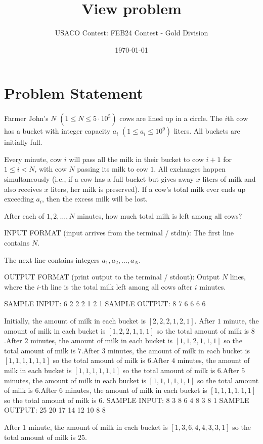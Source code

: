 \documentclass[12pt]{article}
\title{View problem}
\author{USACO Contest: FEB24 Contest - Gold Division}
\date{\today}
\begin{document}
\maketitle

\section*{Problem Statement}


Farmer John's $N$ $(1 \leq N \leq 5 \cdot 10^5)$ cows are lined up in a circle.
The $i$th cow has a bucket with integer capacity $a_i$ $(1 \leq a_i \leq 10^9)$
liters. All buckets are initially full.

Every minute, cow $i$ will pass all the milk in their bucket to cow $i+1$ for
$1\le i<N$, with cow $N$ passing its milk to cow $1$. All exchanges happen
simultaneously (i.e., if a cow has a full bucket but gives away $x$ liters of
milk and also receives $x$ liters, her milk is preserved). If a cow's total milk
ever ends up exceeding $a_i$, then the excess milk will be lost.

After each of $1, 2, \dots, N$ minutes, how much total milk is left among all
cows?

INPUT FORMAT (input arrives from the terminal / stdin):
The first line contains $N$. 

The next line contains integers $a_1,a_2,...,a_N$.


OUTPUT FORMAT (print output to the terminal / stdout):
Output $N$ lines, where the $i$-th line is the total milk left among all cows
after $i$ minutes.

SAMPLE INPUT:
6
2 2 2 1 2 1
SAMPLE OUTPUT: 
8
7
6
6
6
6

Initially, the amount of milk in each bucket is $[2, 2, 2, 1, 2, 1]$.
After $1$ minute, the amount of milk in each bucket is $[1, 2, 2, 1, 1, 1]$
so the total amount of milk is $8$.After $2$ minutes, the amount of
milk in each bucket is $[1, 1, 2, 1, 1, 1]$ so the total amount of milk is
$7$.After $3$ minutes, the amount of milk in each bucket is
$[1, 1, 1, 1, 1, 1]$ so the total amount of milk is $6$.After $4$
minutes, the amount of milk in each bucket is  $[1, 1, 1, 1, 1, 1]$ so the total
amount of milk is $6$.After $5$ minutes, the amount of milk in each
bucket is $[1, 1, 1, 1, 1, 1]$ so the total amount of milk is $6$.After $6$ minutes, the amount of milk in each bucket is $[1, 1, 1, 1, 1, 1]$
so the total amount of milk is
$6$.
SAMPLE INPUT:
8
3 8 6 4 8 3 8 1
SAMPLE OUTPUT: 
25
20
17
14
12
10
8
8

After $1$ minute, the amount of milk in each bucket is
$[1, 3, 6, 4, 4, 3, 3, 1]$ so the total amount of milk is $25$.
\end{document}
